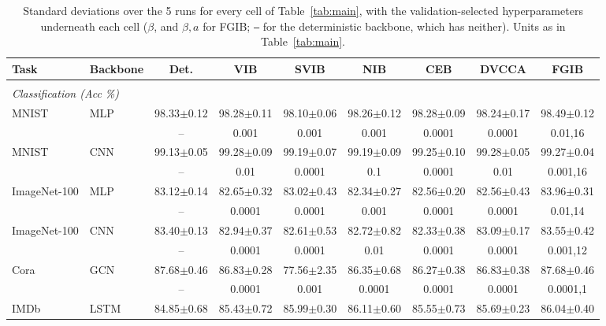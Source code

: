 \begin{table}[t]
\caption{Standard deviations over the 5 runs for every cell of Table~\ref{tab:main}, with the validation-selected hyperparameters underneath each cell ($\beta$, and $\beta,a$ for FGIB; \texttt{--} for the deterministic backbone, which has neither). Units as in Table~\ref{tab:main}.}
\label{tab:main-std}
\begin{center}\scriptsize
\begin{tabular}{llccccccc}
Task & Backbone & Det. & VIB & SVIB & NIB & CEB & DVCCA & FGIB \\ \hline \\[-1.8ex]
\multicolumn{9}{l}{\emph{Classification (Acc \%)}} \\[0.3ex]
MNIST & MLP & 98.33$\pm$0.12 & 98.28$\pm$0.11 & 98.10$\pm$0.06 & 98.26$\pm$0.12 & 98.28$\pm$0.09 & 98.24$\pm$0.17 & 98.49$\pm$0.12 \\
 & & {\tiny --} & {\tiny 0.001} & {\tiny 0.001} & {\tiny 0.001} & {\tiny 0.0001} & {\tiny 0.0001} & {\tiny 0.01,16} \\[0.4ex]
MNIST & CNN & 99.13$\pm$0.05 & 99.28$\pm$0.09 & 99.19$\pm$0.07 & 99.19$\pm$0.09 & 99.25$\pm$0.10 & 99.28$\pm$0.05 & 99.27$\pm$0.04 \\
 & & {\tiny --} & {\tiny 0.01} & {\tiny 0.0001} & {\tiny 0.1} & {\tiny 0.0001} & {\tiny 0.01} & {\tiny 0.001,16} \\[0.4ex]
ImageNet-100 & MLP & 83.12$\pm$0.14 & 82.65$\pm$0.32 & 83.02$\pm$0.43 & 82.34$\pm$0.27 & 82.56$\pm$0.20 & 82.56$\pm$0.43 & 83.96$\pm$0.31 \\
 & & {\tiny --} & {\tiny 0.0001} & {\tiny 0.0001} & {\tiny 0.001} & {\tiny 0.0001} & {\tiny 0.0001} & {\tiny 0.01,14} \\[0.4ex]
ImageNet-100 & CNN & 83.40$\pm$0.13 & 82.94$\pm$0.37 & 82.61$\pm$0.53 & 82.72$\pm$0.82 & 82.33$\pm$0.38 & 83.09$\pm$0.17 & 83.55$\pm$0.42 \\
 & & {\tiny --} & {\tiny 0.0001} & {\tiny 0.0001} & {\tiny 0.01} & {\tiny 0.0001} & {\tiny 0.0001} & {\tiny 0.001,12} \\[0.4ex]
Cora & GCN & 87.68$\pm$0.46 & 86.83$\pm$0.28 & 77.56$\pm$2.35 & 86.35$\pm$0.68 & 86.27$\pm$0.38 & 86.83$\pm$0.38 & 87.68$\pm$0.46 \\
 & & {\tiny --} & {\tiny 0.0001} & {\tiny 0.001} & {\tiny 0.0001} & {\tiny 0.0001} & {\tiny 0.0001} & {\tiny 0.0001,1} \\[0.4ex]
IMDb & LSTM & 84.85$\pm$0.68 & 85.43$\pm$0.72 & 85.99$\pm$0.30 & 86.11$\pm$0.60 & 85.55$\pm$0.73 & 85.69$\pm$0.23 & 86.04$\pm$0.40 \\

\end{tabular}
\end{center}
\end{table}
